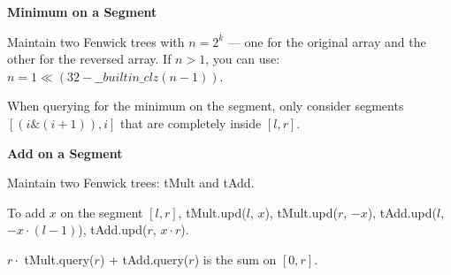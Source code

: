 \textbf{Minimum on a Segment}

Maintain two Fenwick trees with $n = 2^k$ — one for the original array and the other for the reversed array. If $n > 1$, you can use:
$n = 1 \ll (32 - \_\_builtin\_clz(n - 1))$.

When querying for the minimum on the segment, only consider segments $[(i \& (i + 1)), i]$ that are completely inside $[l, r]$.

\textbf{Add on a Segment}

Maintain two Fenwick trees: tMult and tAdd.

To add $x$ on the segment $[l, r]$, tMult.upd($l$, $x$), tMult.upd($r$, $-x$),
tAdd.upd($l$, $-x \cdot (l - 1)$), tAdd.upd($r$, $x \cdot r$).

$r \cdot$ tMult.query($r$) + tAdd.query($r$) is the sum on $[0, r]$.